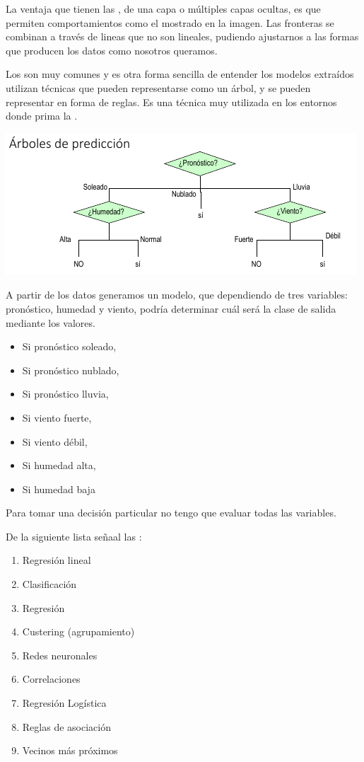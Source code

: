 La ventaja que tienen las , de una capa o múltiples capas ocultas, es que permiten comportamientos  como el mostrado en la imagen. Las fronteras se combinan a través de lineas que no son lineales, pudiendo ajustarnos a las formas que producen los datos como nosotros queramos.

Los  son muy comunes y es otra forma sencilla de entender los modelos extraídos utilizan técnicas que pueden representarse como un árbol, y se pueden representar en forma de reglas. Es una técnica muy utilizada en los entornos donde prima la .

\begin{center}
    \includegraphics[scale=.95]{images/mod01-24.png}
\end{center}

A partir de los datos generamos un modelo, que dependiendo de tres variables: pronóstico, humedad y viento, podría determinar cuál será la clase de salida mediante los valores.
\begin{itemize}
    \item Si pronóstico soleado, 
    \item Si pronóstico nublado,
    \item Si pronóstico lluvia,
    \item Si viento fuerte,
    \item Si viento débil,
    \item Si humedad alta,
    \item Si humedad baja
\end{itemize}

Para tomar una decisión particular no tengo que evaluar todas las variables.

De la siguiente lista señaal las :

\begin{enumerate}[label=\Alph*)]
    \item Regresión lineal
    \item Clasificación 
    \item Regresión
    \item Custering (agrupamiento)
    \item Redes neuronales 
    \item Correlaciones 
    \item Regresión Logística 
    \item Reglas de asociación
    \item Vecinos más próximos
\end{enumerate}

